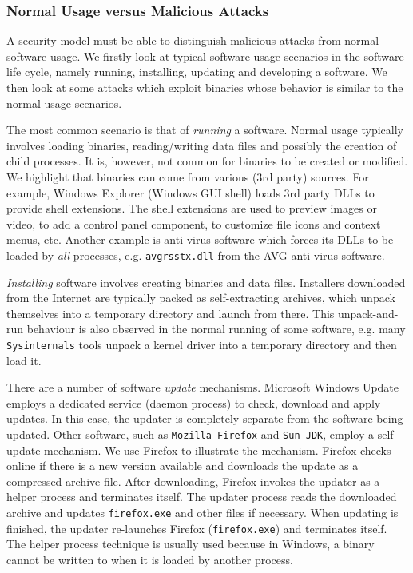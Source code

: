 \subsubsection{Normal Usage versus Malicious Attacks}
\label{sec:usageattack}

A security model must be able to distinguish
malicious attacks from normal software usage.
We firstly look at typical software usage scenarios in the
software life cycle, namely running, installing, updating and developing 
a software.
We then look at some attacks which exploit binaries whose
behavior is similar to the normal usage scenarios.

The most common scenario is that of {\em running} a software.
Normal usage typically involves loading binaries,
reading/writing data files and possibly the creation of child processes.
It is, however, not common for binaries to be created or modified.
We highlight that binaries can come from
various (3rd party) sources.
For example, Windows Explorer (Windows GUI shell) loads 3rd party DLLs
to provide shell extensions.
The shell extensions are used to preview
images or video, to add a control panel component, to customize
file icons and context menus, etc.
Another example is anti-virus software which forces
its DLLs to be loaded by {\em all} processes, e.g. {\tt avgrsstx.dll}
from the AVG anti-virus software.

{\em Installing} software involves creating binaries
and data files.
Installers downloaded from the Internet are typically packed as
self-extracting archives, which
unpack themselves into a temporary directory and launch from there.
This unpack-and-run behaviour is also observed in the normal
running of some software, e.g.
many {\tt Sysinternals} tools
unpack a kernel driver into a temporary directory and then load it.

There are a number of software {\em update} mechanisms.
Microsoft Windows Update employs a dedicated service (daemon process) to check,
download and apply updates.
In this case, the updater is completely separate from 
the software being updated.
Other software, such as {\tt Mozilla Firefox} and {\tt Sun JDK},
employ a self-update mechanism.
We use Firefox to illustrate the mechanism.
Firefox checks online if there is a new version available and
downloads the update as a compressed archive file.
After downloading, Firefox invokes the updater
as a helper process and terminates itself.
The updater process reads the downloaded archive and 
updates {\tt firefox.exe}
and other files if necessary.
When updating is finished, the updater re-launches Firefox ({\tt firefox.exe})
and terminates itself.
The helper process technique is usually used
because in Windows, a binary cannot be written to when it is loaded by
another process.

